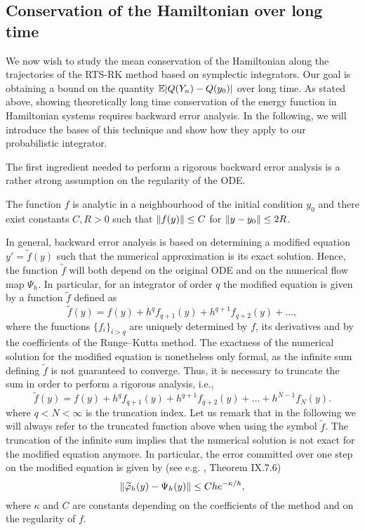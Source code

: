\documentclass[10pt]{article}
\begin{document}
\subsection{Conservation of the Hamiltonian over long time} We now wish to study the mean conservation of the Hamiltonian along the trajectories of the RTS-RK method based on symplectic integrators. Our goal is obtaining a bound on the quantity $\operatorname{\mathbb{E}}\lvert Q(Y_n) - Q(y_0)\rvert$ over long time. As stated above, showing theoretically long time conservation of the energy function in Hamiltonian systems requires backward error analysis. In the following, we will introduce the bases of this technique and show how they apply to our probabilistic integrator. 

The first ingredient needed to perform a rigorous backward error analysis is a rather strong assumption on the regularity of the ODE.
\begin{assumption}\label{as:RegHamiltonian} The function $f$ is analytic in a neighbourhood of the initial condition $y_0$ and there exist constants $C, R > 0$ such that $\lVert f(y)\rVert \leq C$ for $\lVert y - y_0\rVert \leq 2R$.
\end{assumption}
In general, backward error analysis is based on determining a modified equation $y' = \tilde f(y)$ such that the numerical approximation is its exact solution. Hence, the function $\tilde f$ will both depend on the original ODE and on the numerical flow map $\Psi_h$. In particular, for an integrator of order $q$ the modified equation is given by a function $\tilde f$ defined as
\begin{equation}
\tilde f(y) = f(y) + h^q f_{q+1}(y) + h^{q+1} f_{q+2}(y) + \ldots,
\end{equation}
where the functions $\{f_i\}_{i>q}$ are uniquely determined by $f$, its derivatives and by the coefficients of the Runge--Kutta method. The exactness of the numerical solution for the modified equation is nonetheless only formal, as the infinite sum defining $\tilde f$ is not guaranteed to converge. Thus, it is necessary to truncate the sum in order to perform a rigorous analysis, i.e.,
\begin{equation}
\tilde f(y) = f(y) + h^q f_{q+1}(y) + h^{q+1} f_{q+2}(y) + \ldots + h^{N-1}f_N(y).
\end{equation}
where $q < N < \infty$ is the truncation index. Let us remark that in the following we will always refer to the truncated function above when using the symbol $\tilde f$. The truncation of the infinite sum implies that the numerical solution is not exact for the modified equation anymore. In particular, the error committed over one step on the modified equation is given by (see e.g. \cite{HLW06}, Theorem IX.7.6)
\begin{equation}\label{eq:OneStepModEq}
\lVert\widetilde {\varphi}_h(y) - \Psi_h(y)\rVert \leq Che^{-\kappa/h},
\end{equation}
where $\kappa$ and $C$ are constants depending on the coefficients of the method and on the regularity of $f$.
\end{document}

